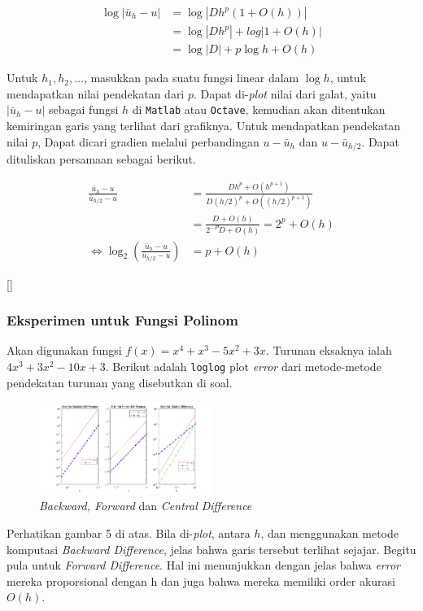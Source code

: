 \documentclass[10pt, a4paper, onecolumn, oneside, final]{report}
\begin{document}
$$
\begin{aligned}
\log |\bar{u}_h - u| &= \log|Dh^p(1+O(h))|\\
&= \log|Dh^p| + log|1+O(h)|\\
&= \log|D| + p \log h + O(h)
\end{aligned}
$$

Untuk $h_1, h_2, \dots$, masukkan pada suatu fungsi linear dalam $\log h$, untuk mendapatkan nilai pendekatan dari $p$. Dapat di-\textit{plot} nilai dari galat, yaitu $|\bar{u}_h - u|$ sebagai fungsi $h$ di \texttt{Matlab} atau \texttt{Octave}, kemudian akan ditentukan kemiringan garis yang terlihat dari grafiknya. Untuk mendapatkan pendekatan nilai $p$, Dapat dicari gradien melalui perbandingan $u - \bar{u}_h$ dan $u - \bar{u}_{h/2}$. Dapat dituliskan persamaan sebagai berikut.

$$
\begin{aligned}
\frac{\bar{u}_h - u}{\bar{u}_{h/2} - u} &= \frac{Dh^p + O(h^{p+1})}{D(h/2)^p + O((h/2)^{p+1})}\\
&= \frac{D + O(h)}{2^{-P}D + O(h)} = 2^p + O(h)\\
\iff\log_2(\frac{\bar{u}_h - u}{\bar{u}_{h/2} - u}) &= p + O(h)
\end{aligned}
$$

[\cite{kth}]


\subsubsection*{Eksperimen untuk Fungsi Polinom}
Akan digunakan fungsi $f(x) = x^4 + x^3 - 5x^2 + 3x$. Turunan eksaknya ialah $4x^3 + 3x^2 - 10x + 3$. Berikut adalah \texttt{loglog} plot \textit{error} dari metode-metode pendekatan turunan yang disebutkan di soal.
\begin{figure}[h!]
    \centering
    \includegraphics[width=0.5\textwidth]{Nomor4/nomor4-1.png}
    \caption{\textit{Backward, Forward} dan \textit{Central Difference}}
    \label{fig:my_label}
\end{figure}

Perhatikan gambar 5 di atas. Bila di-\textit{plot}, antara $h$, dan menggunakan metode komputasi \textit{Backward Difference}, jelas bahwa garis tersebut terlihat sejajar. Begitu pula untuk \textit{Forward Difference}. Hal ini menunjukkan dengan jelas bahwa \textit{error} mereka proporsional dengan h dan juga bahwa mereka memiliki order akurasi $O(h)$. 
\end{document}
